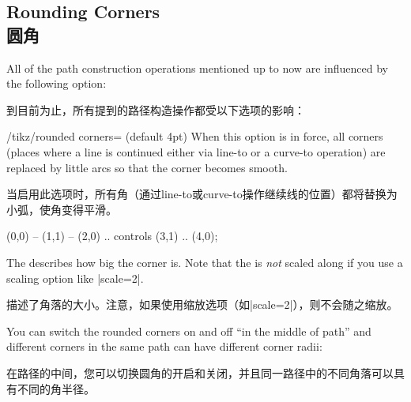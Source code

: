 \subsection{Rounding Corners\\圆角}

All of the path construction operations mentioned up to now are influenced by
the following option:

到目前为止，所有提到的路径构造操作都受以下选项的影响：

\begin{key}{/tikz/rounded corners= (default 4pt)}
    When this option is in force, all corners (places where a line is continued
    either via line-to or a curve-to operation) are replaced by little arcs so
    that the corner becomes smooth.
    
当启用此选项时，所有角（通过line-to或curve-to操作继续线的位置）都将替换为小弧，使角变得平滑。
\begin{codeexample}[]
\tikz {} (0,0) -- (1,1)
           -- (2,0) .. controls (3,1) .. (4,0);
\end{codeexample}

    The  describes how big the corner is. Note that the
     is \emph{not} scaled along if you use a scaling option like
    |scale=2|.

    描述了角落的大小。注意，如果使用缩放选项（如|scale=2|），则不会随之缩放。


\begin{codeexample}[]
\end{codeexample}

    You can switch the rounded corners on and off ``in the middle of path'' and
    different corners in the same path can have different corner radii:
    
    在路径的中间，您可以切换圆角的开启和关闭，并且同一路径中的不同角落可以具有不同的角半径。

%
\begin{codeexample}[]
\end{codeexample}


\end{key}
